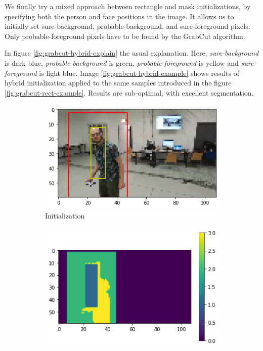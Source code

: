 We finally try a mixed approach between rectangle and mask initializations, by specifying both the person and face positions in the image. It allows us to initially set sure-background, probable-background, and sure-foreground pixels. Only probable-foreground pixels have to be found by the GrabCut algorithm. 

In figure \ref{fig:grabcut-hybrid-explain} the usual explanation. Here, \textit{sure-background} is dark blue, \textit{probable-background} is green, \textit{probable-foreground} is yellow and \textit{sure-foreground} is light blue. 
Image \ref{fig:grabcut-hybrid-example} shows results of hybrid initialization applied to the same samples introduced in the figure \ref{fig:grabcut-rect-example}. Results are sub-optimal, with excellent segmentation.

\begin{figure}[!h]
	\begin{center}
		\begin{subfigure}[h]{0.24\textwidth}
			\centering
			\includegraphics[width=1\textwidth]{"contents/images/04-2grabcut-3hybrid-steps-1"}
			\caption[]{Initialization}
			\label{fig:grabcut-hybrid-explain-1}
		\end{subfigure}
		\hfill
		\begin{subfigure}[h]{0.24\textwidth}
			\centering
			\includegraphics[width=1\textwidth]{"contents/images/04-2grabcut-3hybrid-steps-2"}

\end{subfigure}
\end{center}
\end{figure}

